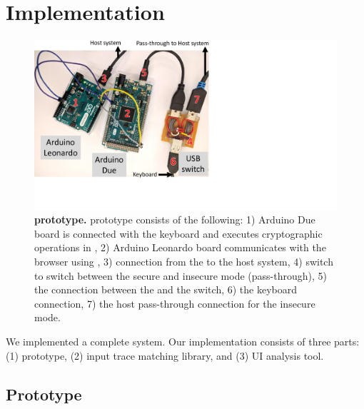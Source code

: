 \section{Implementation}
\label{sec:implementation_IK}

\begin{figure}[t]
  \centering
    \includegraphics[trim={0 2.5cm 14cm 0}, clip, width=0.75\linewidth]{chapters/IntegriKey/images/setup4_revised.pdf}
    \caption[\device prototype]{\textbf{\device prototype.} \device prototype consists of the following: 1) Arduino Due board is connected with the keyboard and executes cryptographic operations in \tls, 2) Arduino Leonardo board communicates with the browser using \webusb, 3) \usb connection from the \device to the host system, 4) \usb switch to switch between the secure and insecure mode (pass-through), 5) the connection between the \device and the \usb switch, 6) the keyboard connection, 7) the host pass-through connection for the insecure mode.}
    \label{fig:integrikeySetup}
\end{figure}

We implemented a complete \name system. Our implementation consists of three parts: (1) \device prototype, (2) \server input trace matching library, and (3) \tool UI analysis tool. 

\subsection{\device Prototype} 

